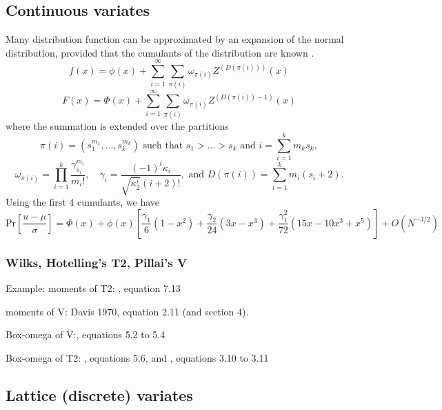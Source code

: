 \subsection{Continuous variates}

Many distribution function can be approximated by an expansion of the normal distribution, provided that the cumulants of the distribution are known \citep{Lee_1992}.
\begin{equation}
	f(x) = \phi(x) + \sum_{i=1}^{\infty} \sum_{\pi(i)} \omega_{\pi(i)} Z^{(D(\pi(i)))}(x)
\end{equation}
\begin{equation}
	F(x) = \Phi(x) + \sum_{i=1}^{\infty} \sum_{\pi(i)} \omega_{\pi(i)} Z^{(D(\pi(i))-1)}(x)
\end{equation}
where the summation is extended over the partitions
\begin{equation}
	\pi(i) = \left(s_1^{m_1},\ldots,s_k^{m_k}\right) \text{ such that } s_1 > \ldots > s_k \text{ and } i = \sum_{i=1}^k{m_k s_k},
\end{equation}
\begin{equation}
	\omega_{\pi(i)} = \prod_{i=1}^k \frac{\gamma_{s_i}^{m_i}}{m_i !}, \quad \gamma_i = \frac{(-1)^i \kappa_i}{\sqrt{\kappa_2^i}(i+2)!}, \text{ and } D(\pi(i)) = \sum_{i=1}^k m_i (s_i +2).
\end{equation}
Using the first 4 cumulants, we have
\begin{equation}
	\text{Pr}\left[\frac{u-\mu}{\sigma}\right] = \Phi(x) + \phi(x)\left[\frac{\gamma_1}{6}(1-x^2) + \frac{\gamma_2}{24}(3x-x^3) +  \frac{\gamma_1^2}{72}(15x-10x^3+x^5)\right] + O(N^{-3/2}) 
\end{equation}


\subsubsection{Wilks, Hotelling's T2, Pillai's V}


Example: moments of T2: \cite{Davis_1968} , equation 7.13

moments of V:  \cite{Davis_1970a} Davis 1970, equation 2.11 (and section 4).

Box-omega of V:\cite{Davis_1970a}, equations 5.2 to 5.4 

Box-omega of T2: \cite{Davis_1970a}, equations 5.6, and \cite{Davis_1970b}, equations 3.10 to 3.11



\subsection{Lattice (discrete) variates}





